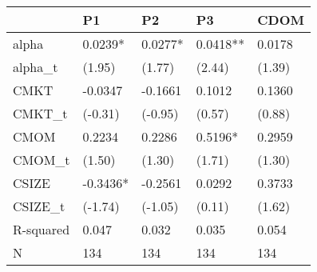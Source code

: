 \begin{tabular}{lllll}
\toprule
 & P1 & P2 & P3 & CDOM \\
\midrule
alpha & 0.0239* & 0.0277* & 0.0418** & 0.0178 \\
alpha_t & (1.95) & (1.77) & (2.44) & (1.39) \\
CMKT & -0.0347 & -0.1661 & 0.1012 & 0.1360 \\
CMKT_t & (-0.31) & (-0.95) & (0.57) & (0.88) \\
CMOM & 0.2234 & 0.2286 & 0.5196* & 0.2959 \\
CMOM_t & (1.50) & (1.30) & (1.71) & (1.30) \\
CSIZE & -0.3436* & -0.2561 & 0.0292 & 0.3733 \\
CSIZE_t & (-1.74) & (-1.05) & (0.11) & (1.62) \\
R-squared & 0.047 & 0.032 & 0.035 & 0.054 \\
N & 134 & 134 & 134 & 134 \\
\bottomrule
\end{tabular}
